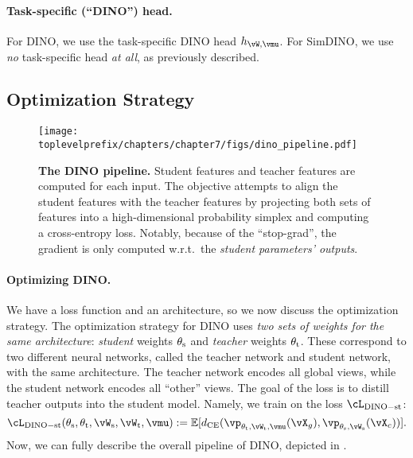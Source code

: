 \documentclass[\toplevelprefix/book-main.tex]{subfiles}
\begin{document}
\paragraph{Task-specific (``DINO'') head.} For DINO, we use the task-specific DINO head \(h_{\vW, \vmu}\). For SimDINO, we use \textit{no} task-specific head \textit{at all}, as previously described.

\subsection{Optimization Strategy}\label{sub:contrastive_learning_optimization}

\begin{figure}
    \centering 
    \texttt{[image: \\toplevelprefix/chapters/chapter7/figs/dino\_pipeline.pdf]}
    \caption{\small \textbf{The DINO pipeline.} Student features and teacher features are computed for each input. The objective attempts to align the student features with the teacher features by projecting both sets of features into a high-dimensional probability simplex and computing a cross-entropy loss. Notably, because of the ``stop-grad'', the gradient is only computed w.r.t.~the \textit{student parameters' outputs}.}
    \label{fig:dino_pipeline}
\end{figure}

\paragraph{Optimizing DINO.} We have a loss function and an architecture, so we now discuss the optimization strategy. The optimization strategy for DINO uses \textit{two sets of weights for the same architecture}: \textit{student} weights \(\theta_{\mathrm{s}}\) and \textit{teacher} weights \(\theta_{\mathrm{t}}\). These correspond to two different neural networks, called the teacher network and student network, with the same architecture. The teacher network encodes all global views, while the student network encodes all ``other'' views. The goal of the loss is to distill teacher outputs into the student model. Namely, we train on the loss \(\cL_{\dino{}-\student\teacher}\):
\begin{equation}\label{eq:dino_loss_teacherstudent}
    \cL_{\dino{}-\student\teacher}(\theta_{\student}, \theta_{\teacher}, \vW_{\student}, \vW_{\teacher}, \vmu) := \Ex[d_{\CE}(\vp_{\theta_{\teacher}, \vW_{\teacher}, \vmu}(\vX_{g}), \vp_{\theta_{\student}, \vW_{\student}}(\vX_{c}))].
\end{equation}
Now, we can fully describe the overall pipeline of DINO, depicted in .
\end{document}
